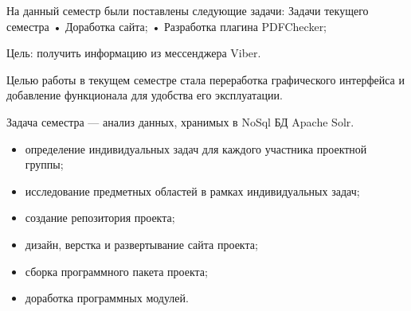 На данный семестр были поставлены следующие задачи:
Задачи текущего семестра
• Доработка сайта;
• Разработка плагина PDFChecker;

	Цель: получить информацию из мессенджера Viber.
	
	Целью работы в текущем семестре стала переработка графического интерфейса и добавление функционала для удобства его эксплуатации.
	
	Задача семестра --- анализ данных, хранимых в NoSql БД Apache Solr.

\begin{itemize}
  \item определение индивидуальных задач для каждого участника проектной группы;
  \item исследование предметных областей в рамках индивидуальных задач; 
  \item создание репозитория проекта;
  \item дизайн, верстка и развертывание сайта проекта;
  \item сборка программного пакета проекта;   
  \item доработка программных модулей.
\end{itemize}

